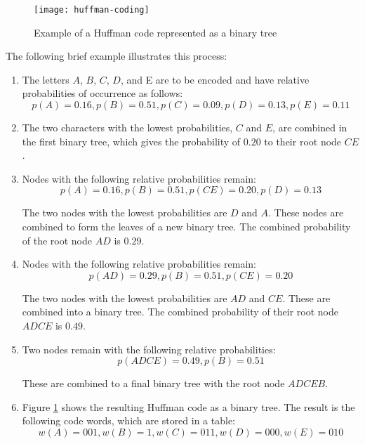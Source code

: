\begin{figure}[ht!]
	\centering
	\texttt{[image: huffman-coding]}
	\caption{Example of a Huffman code represented as a binary tree}{\label{fig:huffman-coding}}
\end{figure}

The following brief example illustrates this process:

\begin{enumerate}
	\item The letters $ A $, $ B $, $ C $, $ D $, and E are to be encoded and have relative probabilities of occurrence as follows:
	\[p(A)=0.16, p(B)=0.51, p(C)=0.09, p(D)=0.13, p(E)=0.11\]
	
	\item The two characters with the lowest probabilities, $ C $ and $ E $, are combined in the first binary tree, which gives the probability of $ 0.20 $ to their root node $ CE $. 
	
	\item Nodes with the following relative probabilities remain:
	\[p(A)=0.16, p(B)=0.51, p(CE)=0.20, p(D)=0.13\]
	
	The two nodes with the lowest probabilities are $ D $ and $ A $. These nodes are combined to form the leaves of a new binary tree. The combined probability of the
	root node $ AD $ is $ 0.29 $.
	
	
	\item Nodes with the following relative probabilities remain:
	\[p(AD)=0.29, p(B)=0.51, p(CE)=0.20\]
	
	The two nodes with the lowest probabilities are $ AD $ and $ CE $. These are combined into a binary tree. The combined probability of their root node $ ADCE $ is $ 0.49 $. 
	
	\item Two nodes remain with the following relative probabilities:
	\[p(ADCE)=0.49, p(B)=0.51\]
	
	These are combined to a final binary tree with the root node $ ADCEB $. 
	\item Figure {\ref{fig:huffman-coding}} shows the resulting Huffman code as a binary tree. The result is the following code words, which are stored in a table:
	\[w(A)=001, w(B)=1, w(C)=011, w(D)=000, w(E)=010\]
\end{enumerate}

